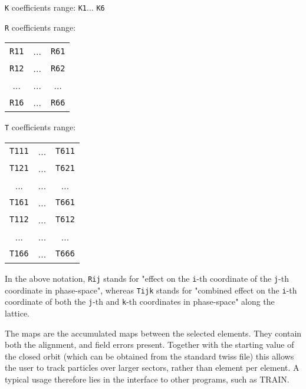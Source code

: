 

\texttt{K} coefficients range: 
\texttt{K1}... 
\texttt{K6}


\texttt{R} coefficients range: 
\begin{tabular}{ccc}
\texttt{R11} & ... & \texttt{R61} \\ 
\texttt{R12} & ... & \texttt{R62} \\ 
... & ... & ... \\ 
\texttt{R16} & ... & \texttt{R66}
\end{tabular}


\texttt{T} coefficients range: 
\begin{tabular}{ccc}
\texttt{T111} & ... &\texttt{T611} \\ 
\texttt{T121} & ... & \texttt{T621} \\ 
... & ... & ... \\ 
\texttt{T161} & ... & \texttt{T661} \\ 
\texttt{T112} & ... & \texttt{T612} \\ 
... & ... & ... \\ 
\texttt{T166} & ... & \texttt{T666}
\end{tabular}

 In the above notation, 
\texttt{Rij} stands for "effect on the 
\texttt{i}-th coordinate of the 
\texttt{j}-th coordinate in phase-space", whereas 
\texttt{Tijk} stands for "combined effect on the 
\texttt{i}-th coordinate of both the 
\texttt{j}-th and 
\texttt{k}-th coordinates in phase-space" along the lattice. 

% 
% 
% 
% 
% 
% 
% 
   
The maps are the accumulated maps between the selected elements. They
contain both the alignment, and field errors present. Together with the
starting value of the closed orbit (which can be obtained from the
standard twiss file) this allows the user to track particles over larger
sectors, rather than element per element. A typical usage therefore lies
in the interface to other programs, such as TRAIN.  


